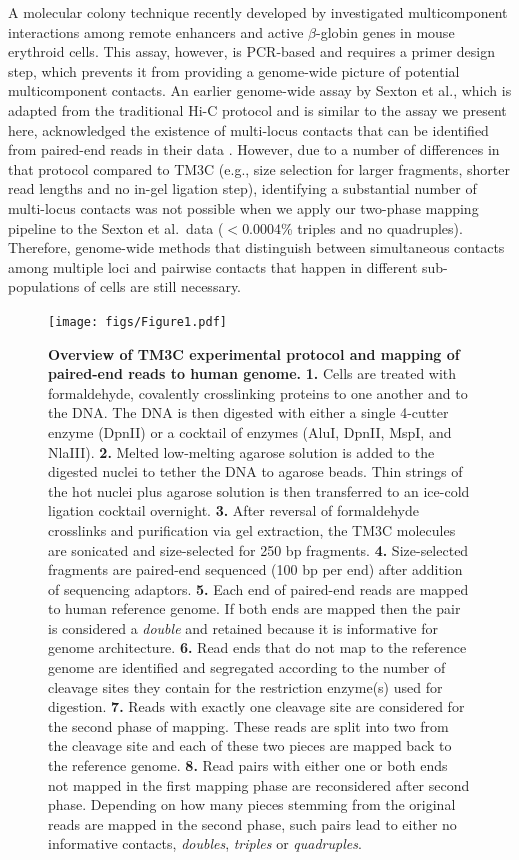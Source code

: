 {
A molecular colony technique recently developed by \citet{gavrilov:quantitative}
investigated multicomponent interactions
among remote enhancers and active $\beta$-globin genes in
mouse erythroid cells. This assay, however, is PCR-based and requires a
primer design step, which prevents it from providing a genome-wide
picture of potential multicomponent contacts. An earlier genome-wide
assay by Sexton et al., which is adapted from the traditional Hi-C protocol and
is similar to the assay we present here, acknowledged the existence
of multi-locus contacts that can be identified from paired-end reads
in their data \citep{sexton:three-dimensional}.
However, due to a number of differences in that
protocol compared to TM3C (e.g., size selection for larger fragments,
shorter read lengths and no in-gel ligation step), identifying a
substantial number of multi-locus contacts was not possible when we
apply our two-phase mapping pipeline to the Sexton et al.\ data
($<$0.0004\% triples and no quadruples). Therefore, genome-wide methods
that distinguish between simultaneous contacts among multiple loci and
pairwise contacts that happen in different sub-populations of cells
are still necessary.
}
\begin{figure}
\centering
\texttt{[image: figs/Figure1.pdf]}
\caption{
\textbf{Overview of TM3C experimental protocol and mapping of paired-end reads to human genome.}
  {\bf 1.} Cells are treated with
  formaldehyde, covalently crosslinking proteins to one another and to
  the DNA. The DNA is then digested with either a single 4-cutter
  enzyme (DpnII) or a cocktail of enzymes (AluI, DpnII, MspI, and
  NlaIII). {\bf 2.} Melted low-melting agarose solution is added to
  the digested nuclei to tether the DNA to agarose beads.  Thin
  strings of the hot nuclei plus agarose solution is then transferred to an
  ice-cold ligation cocktail overnight. {\bf 3.} After reversal of
  formaldehyde crosslinks and purification via gel extraction, the
  TM3C molecules are sonicated and size-selected for 250 bp fragments.
  {\bf 4.} Size-selected fragments are paired-end sequenced (100 bp per end)
  after addition of sequencing adaptors.
  {\bf 5.} Each end of paired-end reads are mapped to human reference genome.
  If both ends are mapped then the pair is considered a \emph{double} and retained
  because it is informative for genome architecture.
  {\bf 6.} Read ends that do not map to the reference genome are identified
  and segregated according to the number of cleavage sites they contain for
  the restriction enzyme(s) used for digestion.
  {\bf 7.} Reads with exactly one cleavage site are considered for the second
  phase of mapping. These reads are split into two from the cleavage site and
  each of these two pieces are mapped back to the reference genome.
  {\bf 8.} Read pairs with either one or both ends not mapped in the first
  mapping phase are reconsidered after second phase. Depending on how many
  pieces stemming from the original reads are mapped in the second phase,
  such pairs lead to either no informative contacts, \emph{doubles},
  \emph{triples} or \emph{quadruples}.
}
\label{fig:outline}
\end{figure}


